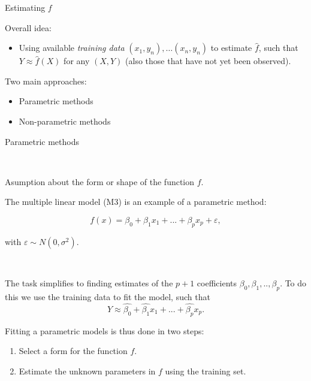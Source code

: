 \documentclass[ignorenonframetext,]{beamer}
\providecommand{\tightlist}{%
  \setlength{\itemsep}{0pt}\setlength{\parskip}{0pt}}
\begin{document}
\begin{frame}{Estimating \(f\)}

Overall idea:

\begin{itemize}
\tightlist
\item
  Using available \emph{training data} \((x_1,y_n),\ldots (x_n,y_n)\) to
  estimate \(\hat{f}\), such that \(Y\approx \hat{f}(X)\) for any
  \((X,Y)\) (also those that have not yet been observed).
\end{itemize}

Two main approaches:

\begin{itemize}
\tightlist
\item
  Parametric methods
\item
  Non-parametric methods
\end{itemize}

\end{frame}

\begin{frame}

\begin{block}{Parametric methods}

\(~\)

Asumption about the form or shape of the function \(f\).

The multiple linear model (M3) is an example of a parametric method:

\[f(x) = \beta_0 + \beta_1 x_1 + ... + \beta_p x_p+\varepsilon, \]

with \(\varepsilon \sim N(0,\sigma^2)\).

\(~\)

The task simplifies to finding estimates of the \(p+1\) coefficients
\(\beta_0, \beta_1, .. ,\beta_p\). To do this we use the training data
to fit the model, such that
\[Y \approx \hat{\beta_0} + \hat{\beta_1} x_1 + ... + \hat{\beta_p} x_p.\]

\end{block}

\end{frame}

\begin{frame}

Fitting a parametric models is thus done in two steps:

\begin{enumerate}
\def\labelenumi{\arabic{enumi}.}
\tightlist
\item
  Select a form for the function \(f\).\\
\item
  Estimate the unknown parameters in \(f\) using the training set.
\end{enumerate}

\end{frame}
\end{document}
